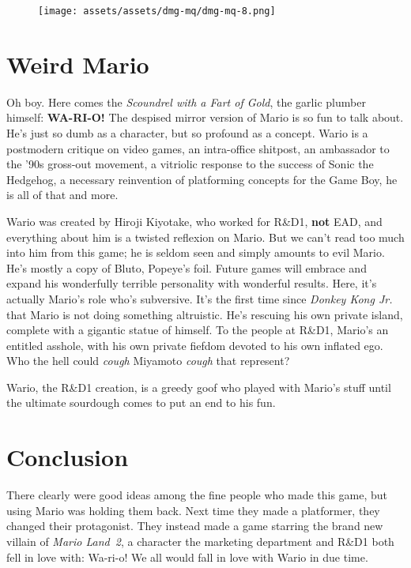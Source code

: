 \documentclass{book}
\begin{document}
\begin{figure}[hbt]
\vskip 10pt
\centering \texttt{[image: assets/assets/dmg-mq/dmg-mq-8.png]}
\vskip 6pt
\end{figure}

\FloatBarrier\needspace{10mm}\section*{Weird Mario}\nopagebreak[4]

Oh boy. Here comes the \emph{Scoundrel with a Fart of Gold}, the garlic plumber himself: \textbf{WA-RI-O!} The despised mirror version of Mario is so fun to talk about. He’s just so dumb as a character, but so profound as a concept. Wario is a postmodern critique on video games, an intra-office shitpost, an ambassador to the ’90s gross-out movement, a vitriolic response to the success of Sonic the Hedgehog, a necessary reinvention of platforming concepts for the Game Boy, he is all of that and more.

Wario was created by Hiroji Kiyotake, who worked for R\&D1, \textbf{not} EAD, and everything about him is a twisted reflexion on Mario. But we can’t read too much into him from this game; he is seldom seen and simply amounts to evil Mario. He’s mostly a copy of Bluto, Popeye’s foil. Future games will embrace and expand his wonderfully terrible personality with wonderful results. Here, it’s actually Mario’s role who’s subversive. It’s the first time since \emph{Donkey Kong Jr.} that Mario is not doing something altruistic. He’s rescuing his own private island, complete with a gigantic statue of himself. To the people at R\&D1, Mario’s an entitled asshole, with his own private fiefdom devoted to his own inflated ego. Who the hell could \emph{cough} Miyamoto \emph{cough} that represent?

Wario, the R\&D1 creation, is a greedy goof who played with Mario’s stuff until the ultimate sourdough comes to put an end to his fun.

\FloatBarrier\needspace{10mm}\section*{Conclusion}\nopagebreak[4]

There clearly were good ideas among the fine people who made this game, but using Mario was holding them back. Next time they made a platformer, they changed their protagonist. They instead made a game starring the brand new villain of \emph{Mario Land 2}, a character the marketing department and R\&D1 both fell in love with: Wa-ri-o! We all would fall in love with Wario in due time.
\end{document}
